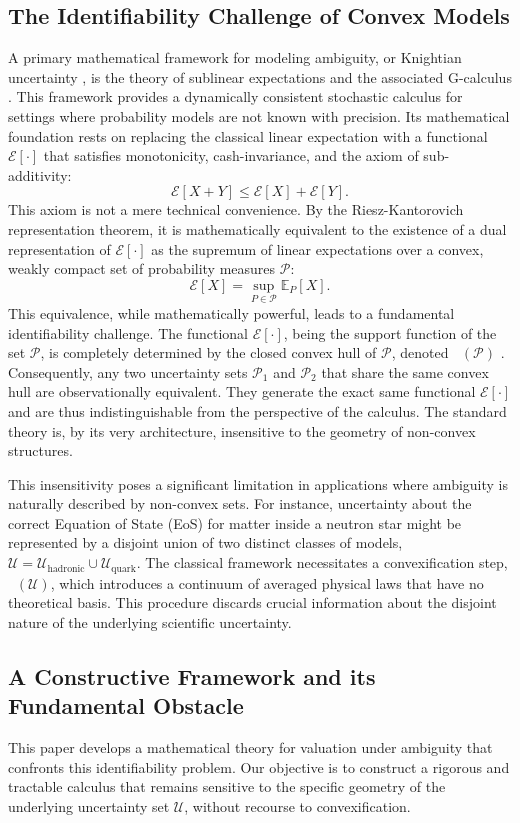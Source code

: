 \documentclass[12pt, letterpaper]{amsart}
\newcommand{\Ecal}{\mathcal{E}}
\newcommand{\Ucal}{\mathcal{U}}
\newcommand{\Pcal}{\mathcal{P}}
\DeclareMathOperator*{\overlineconv}{\overline{conv}}
\theoremstyle{plain}
\theoremstyle{definition}
\theoremstyle{remark}
\numberwithin{equation}{section} %
\begin{document}
\subsection{The Identifiability Challenge of Convex Models}
A primary mathematical framework for modeling ambiguity, or Knightian uncertainty \cite{Knight1921}, is the theory of sublinear expectations and the associated G-calculus \cite{Peng2019}. This framework provides a dynamically consistent stochastic calculus for settings where probability models are not known with precision. Its mathematical foundation rests on replacing the classical linear expectation with a functional $\Ecal[\cdot]$ that satisfies monotonicity, cash-invariance, and the axiom of sub-additivity:
\[ \Ecal[X+Y] \le \Ecal[X] + \Ecal[Y]. \]
This axiom is not a mere technical convenience. By the Riesz-Kantorovich representation theorem, it is mathematically equivalent to the existence of a dual representation of $\Ecal[\cdot]$ as the supremum of linear expectations over a convex, weakly compact set of probability measures $\Pcal$:
\[ \Ecal[X] = \sup_{P \in \Pcal} \mathbb{E}_P[X]. \]
This equivalence, while mathematically powerful, leads to a fundamental identifiability challenge. The functional $\Ecal[\cdot]$, being the support function of the set $\Pcal$, is completely determined by the closed convex hull of $\Pcal$, denoted $\overlineconv(\Pcal)$ \cite{Rockafellar1970}. Consequently, any two uncertainty sets $\Pcal_1$ and $\Pcal_2$ that share the same convex hull are observationally equivalent. They generate the exact same functional $\Ecal[\cdot]$ and are thus indistinguishable from the perspective of the calculus. The standard theory is, by its very architecture, insensitive to the geometry of non-convex structures.

This insensitivity poses a significant limitation in applications where ambiguity is naturally described by non-convex sets. For instance, uncertainty about the correct Equation of State (EoS) for matter inside a neutron star might be represented by a disjoint union of two distinct classes of models, $\Ucal = \Ucal_{\text{hadronic}} \cup \Ucal_{\text{quark}}$. The classical framework necessitates a convexification step, $\overlineconv(\Ucal)$, which introduces a continuum of averaged physical laws that have no theoretical basis. This procedure discards crucial information about the disjoint nature of the underlying scientific uncertainty.

\subsection{A Constructive Framework and its Fundamental Obstacle}
This paper develops a mathematical theory for valuation under ambiguity that confronts this identifiability problem. Our objective is to construct a rigorous and tractable calculus that remains sensitive to the specific geometry of the underlying uncertainty set $\Ucal$, without recourse to convexification.
\end{document}
